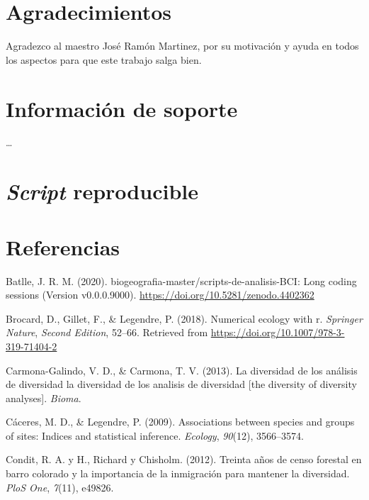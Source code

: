 \documentclass[11pt,]{article}
\begin{document}
\section{Agradecimientos}\label{agradecimientos}

Agradezco al maestro José Ramón Martinez, por su motivación y ayuda en
todos los aspectos para que este trabajo salga bien.

\section{Información de soporte}\label{informaciuxf3n-de-soporte}

\ldots

\section{\texorpdfstring{\emph{Script}
reproducible}{Script reproducible}}\label{script-reproducible}

\section*{Referencias}\label{referencias}

\hypertarget{refs}{}
\hypertarget{ref-jose_ramon_martinez_batlle_2020_4402362}{}
Batlle, J. R. M. (2020). biogeografia-master/scripts-de-analisis-BCI:
Long coding sessions (Version v0.0.0.9000).
\url{https://doi.org/10.5281/zenodo.4402362}

\hypertarget{ref-brocard2011numerical}{}
Brocard, D., Gillet, F., \& Legendre, P. (2018). Numerical ecology with
r. \emph{Springer Nature}, \emph{Second Edition}, 52--66. Retrieved from
\url{https://doi.org/10.1007/978-3-319-71404-2}

\hypertarget{ref-carmona2013diversidad}{}
Carmona-Galindo, V. D., \& Carmona, T. V. (2013). La diversidad de los
análisis de diversidad la diversidad de los analisis de diversidad
{[}the diversity of diversity analyses{]}. \emph{Bioma}.

\hypertarget{ref-caceres2009associations}{}
Cáceres, M. D., \& Legendre, P. (2009). Associations between species and
groups of sites: Indices and statistical inference. \emph{Ecology},
\emph{90}(12), 3566--3574.

\hypertarget{ref-condit2012thirty}{}
Condit, R. A. y H., Richard y Chisholm. (2012). Treinta años de censo
forestal en barro colorado y la importancia de la inmigración para
mantener la diversidad. \emph{PloS One}, \emph{7}(11), e49826.
\end{document}
